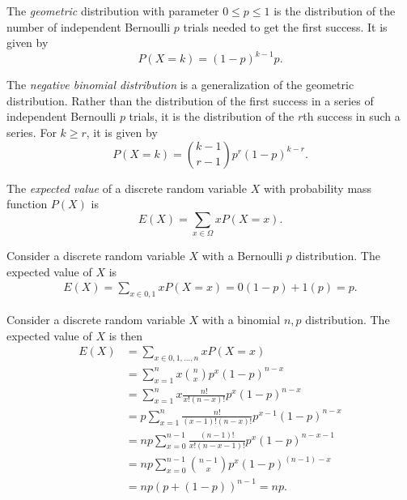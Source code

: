 \begin{defn}
    The \emph{geometric} distribution with parameter $0 \leq p \leq 1$ is the distribution of the number of independent Bernoulli $p$ trials needed to get the first success. It is given by
    \[P(X = k) = (1-p)^{k-1}p.\]
\end{defn}

\begin{defn}
    The \emph{negative binomial distribution} is a generalization of the geometric distribution. Rather than the distribution of the first success in a series of independent Bernoulli $p$ trials, it is the distribution of the $r$th success in such a series. For $k \geq r$, it is given by
    \[P(X = k) = \binom{k-1}{r-1}p^r(1-p)^{k-r}.\]
\end{defn}

\begin{defn}
    The \emph{expected value} of a discrete random variable $X$ with probability mass function $P(X)$ is
    \[E(X) = \sum_{x \in \Omega}xP(X = x).\]
\end{defn}

\begin{exmp}
    Consider a discrete random variable $X$ with a Bernoulli $p$ distribution. The expected value of $X$ is
    \begin{align*}
        E(X) = \sum_{x \in {0, 1}}xP(X = x) = 0(1-p) + 1(p) = p.
    \end{align*}
\end{exmp}

\begin{exmp}
    Consider a discrete random variable $X$ with a binomial $n, p$ distribution. The expected value of $X$ is then
    \begin{align*}
        E(X) &= \sum_{x \in {0, 1, \ldots, n}}xP(X = x) \\
             &= \sum_{x=1}^{n}x\binom{n}{x}p^x(1 - p)^{n-x} \\
             &= \sum_{x=1}^{n}x\frac{n!}{x!(n-x)!}p^x(1 - p)^{n-x} \\
             &= p\sum_{x=1}^{n}\frac{n!}{(x-1)!(n-x)!}p^{x-1}(1 - p)^{n-x} \\
             &= np\sum_{x=0}^{n-1}\frac{(n-1)!}{x!(n-x-1)!}p^x(1 - p)^{n-x-1} \\
             &= np\sum_{x=0}^{n-1}\binom{n-1}{x}p^x(1 - p)^{(n-1)-x} \\
             &= np\left(p+(1-p)\right)^{n-1} = np.
    \end{align*}
\end{exmp}

